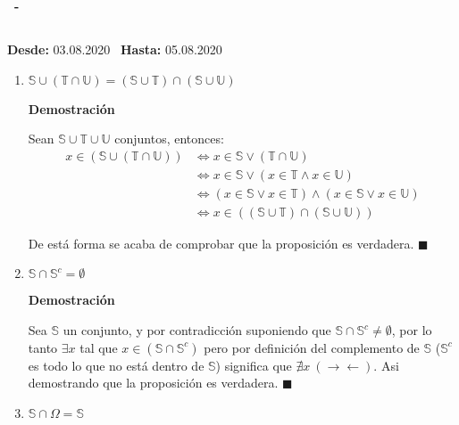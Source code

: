 \documentclass[a4paper,dvipsnames]{book}
\newcommand{\np}{\null\newpage}
\newenvironment{tarea}[3]
    {
        \null\newpage
        \begin{tcolorbox}
            \textbf{\asignatura\ -\ \autor}
            \subsection{\capitalisewords{#1}}

            \begin{flushright}
            \textbf{Desde:}  #2 \
            \textbf{Hasta:}  #3 \
            \end{flushright}
        \end{tcolorbox}

    \begin{enumerate}[{Ejercicio} 1.]
    }
    {
        \end{enumerate}
        \np
    }
\begin{document}
\begin{tarea}{Tarea Demostración de Lemas}{03.08.2020}{05.08.2020}
\begin{enumerate}
                Así demostrando que la proposición es verdadera. $\blacksquare$

                \item $\mathbb S\cup(\mathbb T\cap \mathbb U)=(\mathbb S\cup
                    \mathbb T)\cap(\mathbb S\cup \mathbb U)$

                \textbf{Demostración}

                Sean $\mathbb S\cup\mathbb T\cup\mathbb U$ conjuntos, entonces:
                \begin{equation*}

                \begin{split}
                    x\in\left(\mathbb S\cup\left(\mathbb T\cap \mathbb
                    U\right)\right)&\iff x\in\mathbb S\lor\left(\mathbb
                    T\cap\mathbb U\right)\\
                    &\iff x\in\mathbb S\lor\left(x\in\mathbb T\land x\in\mathbb
                    U\right)\\
                    &\iff \left(x\in\mathbb S\lor x\in\mathbb
                    T\right)\land\left(x\in\mathbb S\lor x\in\mathbb U\right)\\
                    &\iff x \in\left(\left(\mathbb S\cup\mathbb
                    T\right)\cap\left(\mathbb S\cup\mathbb U\right)\right)
                \end{split}
                \end{equation*}

                De está forma se acaba de comprobar que la proposición es
                verdadera. $\blacksquare$

                \item $\mathbb S\cap \mathbb S^{c}=\emptyset$

                \textbf{Demostración}

                Sea $\mathbb S$ un conjunto, y por contradicción suponiendo que
                $\mathbb S\cap\mathbb S^{c}\ne\emptyset$, por lo tanto $\exists
                x$ tal que $x\in\left(\mathbb S\cap\mathbb S^{c}\right)$ pero
                por definición del complemento de $\mathbb S$ ($\mathbb S^{c}$
                es todo lo que no está dentro de $\mathbb S$) significa que
                $\nexists x\ \left(\to\gets\right)$. Asi demostrando que la
                proposición es verdadera. $\blacksquare$

                \item $\mathbb S\cap \Omega=\mathbb S$


\end{enumerate}
\end{tarea}
\end{document}
